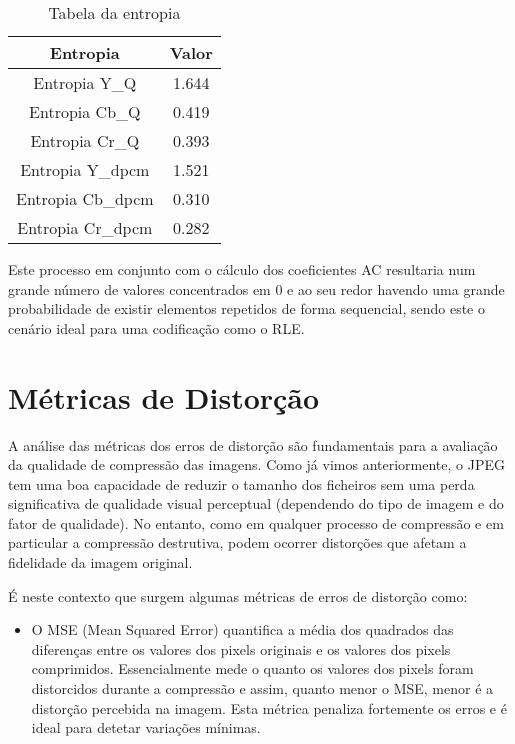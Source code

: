 \documentclass{article}
\begin{document}
\begin{center}
\begin{table}[H]
    \centering
    \begin{tabular}{|c|c|}
        \hline
        \textbf{Entropia} & \textbf{Valor} \\
        \hline
        Entropia Y\_Q & 1.644 \\
        \hline
        Entropia Cb\_Q & 0.419 \\
        \hline
        Entropia Cr\_Q & 0.393 \\
        \hline
        Entropia Y\_dpcm & 1.521 \\
        \hline
        Entropia Cb\_dpcm & 0.310 \\
        \hline
        Entropia Cr\_dpcm & 0.282 \\
        \hline
    \end{tabular}
    \caption{Tabela da entropia}
    \label{tab:tabela3}
\end{table}
\end{center}

Este processo em conjunto com o cálculo dos coeficientes AC resultaria num grande número de valores concentrados em 0 e ao seu redor havendo uma grande probabilidade de existir elementos repetidos de forma sequencial, sendo este o cenário ideal para uma codificação como o RLE.

\newpage

\section{Métricas de Distorção}

A análise das métricas dos erros de distorção são fundamentais para a avaliação da qualidade de compressão das imagens. Como já vimos anteriormente, o JPEG tem uma boa capacidade de reduzir o tamanho dos ficheiros sem uma perda significativa de qualidade visual perceptual (dependendo do tipo de imagem e do fator de qualidade). No entanto, como em qualquer processo de compressão e em particular a compressão destrutiva, podem ocorrer distorções que afetam a fidelidade da imagem original.

É neste contexto que surgem algumas métricas de erros de distorção como:

\begin{itemize}
    \item O MSE (Mean Squared Error) quantifica a média dos quadrados das diferenças entre os valores dos pixels originais e os valores dos pixels comprimidos. Essencialmente mede o quanto os valores dos pixels foram distorcidos durante a compressão e assim, quanto menor o MSE, menor é a distorção percebida na imagem. Esta métrica penaliza fortemente os erros e é ideal para detetar variações mínimas.
\end{itemize}
\end{document}
